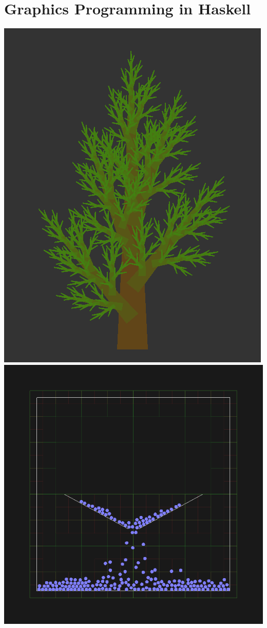 \section{Graphics Programming in Haskell}


\begin{marginfigure}
	\includegraphics{res/gloss/gloss-tree.png}
	\vspace{1em}
	\includegraphics{res/gloss/gloss-styrene.png}

\end{marginfigure}
